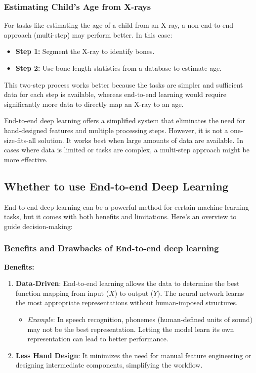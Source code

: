 \documentclass[letterpaper,12pt,notitlepage,twoside]{report}
\begin{document}
\subsubsection{Estimating Child's Age from X-rays}
For tasks like estimating the age of a child from an X-ray, a non-end-to-end approach (multi-step) may perform better. In this case:
\begin{itemize}[nosep]
    \item \textbf{Step 1:} Segment the X-ray to identify bones.
    \item \textbf{Step 2:} Use bone length statistics from a database to estimate age.
\end{itemize}
This two-step process works better because the tasks are simpler and sufficient data for each step is available, whereas end-to-end learning would require significantly more data to directly map an X-ray to an age.

End-to-end deep learning offers a simplified system that eliminates the need for hand-designed features and multiple processing steps. However, it is not a one-size-fits-all solution. It works best when large amounts of data are available. In cases where data is limited or tasks are complex, a multi-step approach might be more effective.

\subsection*{Whether to use End-to-end Deep Learning}
End-to-end deep learning can be a powerful method for certain machine learning tasks, but it comes with both benefits and limitations. Here's an overview to guide decision-making:
\subsubsection*{Benefits and Drawbacks of End-to-end deep learning}
\textbf{Benefits:}
\begin{enumerate}
    \item \textbf{Data-Driven}: End-to-end learning allows the data to determine the best function mapping from input (\(X\)) to output (\(Y\)). The neural network learns the most appropriate representations without human-imposed structures.
    \begin{itemize}
        \item \textit{Example}: In speech recognition, phonemes (human-defined units of sound) may not be the best representation. Letting the model learn its own representation can lead to better performance.
    \end{itemize}
    \item \textbf{Less Hand Design}: It minimizes the need for manual feature engineering or designing intermediate components, simplifying the workflow.
\end{enumerate}
\end{document}
